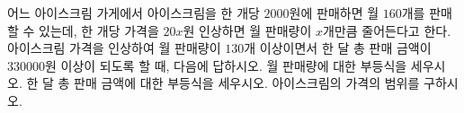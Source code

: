 어느 아이스크림 가게에서 아이스크림을 한 개당 $2000$원에 판매하면 월 $160$개를 판매할 수 있는데, 한 개당 가격을 $20x$원 인상하면 월 판매량이 $x$개만큼 줄어든다고 한다. 아이스크림 가격을 인상하여 월 판매량이 $130$개 이상이면서 한 달 총 판매 금액이 $330000$원 이상이 되도록 할 때, 다음에 답하시오.
 월 판매량에 대한 부등식을 세우시오.
 한 달 총 판매 금액에 대한 부등식을 세우시오.
 아이스크림의 가격의 범위를 구하시오.
